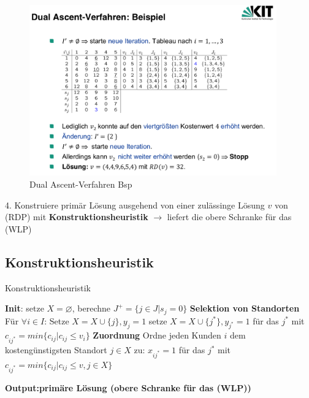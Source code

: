         \begin{figure}[H]
          \centering
          \includegraphics[width=0.95\textwidth]{Images/Dual_Ascent_Verfahrten_Bsp(5).png}
          \caption{Dual Ascent-Verfahren Bsp}
          \label{fig:dual_ascent_verfahren_bsp}
        \end{figure}


      \par 4. Konstruiere primär Lösung ausgehend von einer zulässinge Lösung $v$ von (RDP) mit \textbf{Konstruktionsheuristik} $\rightarrow$ liefert die obere Schranke für das (WLP)

      \subsection{Konstruktionsheuristik} %
      \label{sub:konstruktionsheuristik}

        \begin{algorithm}[H]
          \begin{algorithmic}[1]
            \caption{Konstruktionsheuristik}
            \State \textbf{Init}: setze $X = \varnothing$, berechne $J^+ = \{j \in J | s_j = 0\}$
            \State \textbf{Selektion von Standorten} 
            \State Für $\forall i \in I$: 
              \State Setze $X = X \cup \{j\}, y_j = 1$
              \State setze $X = X \cup \{j^*\}, y_{j^*} = 1$ für das $j^*$ mit $c_{ij^*} = min\{c_{ij}|c_{ij} \leq v_i\}$
            \EndIf
            \State \textbf{Zuordnung}
            \State Ordne jeden Kunden $i$ dem kostengünstigsten Standort $j \in X$ zu:
            $x_{ij^*} = 1$ für das $j^*$ mit $c_{ij^*} = min\{c_{ij}|c_{ij} \leq v, j \in X\}$

            \end{algorithmic}
          \textbf{Output:primäre Lösung (obere Schranke für das (WLP))} 
        \end{algorithm}

